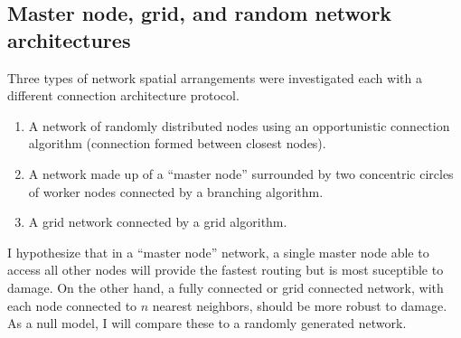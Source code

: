 \documentclass[twocolumn,10pt]{IEEEtran}
\begin{document}
\subsection{Master node, grid, and random network architectures}
Three types of network spatial arrangements were investigated each with a different connection architecture protocol. 
\begin{enumerate}
\item A network of randomly distributed nodes using an opportunistic connection algorithm (connection formed between closest nodes). 
\item A network made up of a ``master node'' surrounded by two concentric circles of worker nodes connected by a branching algorithm.
\item A grid network connected by a grid algorithm. 
\end{enumerate}
I hypothesize that in a ``master node'' network, a single master node able to access all other nodes will provide the fastest routing but is most suceptible to damage. On the other hand, a fully connected or grid connected network, with each node connected to $n$ nearest neighbors, should be more robust to damage. As a null model, I will compare these to a randomly generated network. 



\end{document}
